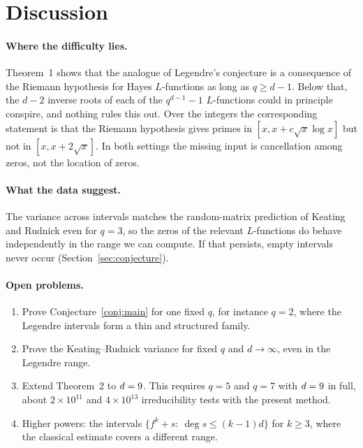 \documentclass[11pt,a4paper]{article}
\theoremstyle{definition}
\theoremstyle{remark}
\begin{document}
\section{Discussion}\label{sec:discussion}

\paragraph{Where the difficulty lies.}
Theorem~1 shows that the analogue of Legendre's conjecture is a consequence of the Riemann
hypothesis for Hayes $L$-functions as long as $q\ge d-1$. Below that, the $d-2$ inverse roots of
each of the $q^{d-1}-1$ $L$-functions could in principle conspire, and nothing rules this out.
Over the integers the corresponding statement is that the Riemann hypothesis gives primes in
$[x,x+c\sqrt x\log x]$ but not in $[x,x+2\sqrt x]$. In both settings the missing input is
cancellation among zeros, not the location of zeros.

\paragraph{What the data suggest.}
The variance across intervals matches the random-matrix prediction of Keating and Rudnick even for
$q=3$, so the zeros of the relevant $L$-functions do behave independently in the range we can
compute. If that persists, empty intervals never occur (Section~\ref{sec:conjecture}).

\paragraph{Open problems.}
\begin{enumerate}[label=(\arabic*),nosep]
\item Prove Conjecture~\ref{conj:main} for one fixed $q$, for instance $q=2$, where the Legendre
      intervals form a thin and structured family.
\item Prove the Keating--Rudnick variance for fixed $q$ and $d\to\infty$, even in the Legendre range.
\item Extend Theorem~2 to $d=9$. This requires $q=5$ and $q=7$ with $d=9$ in full,
      about $2\times10^{11}$ and $4\times10^{13}$ irreducibility tests with the present method.
\item Higher powers: the intervals $\{f^k+s:\ \deg s\le(k-1)d\}$ for $k\ge3$, where the
      classical estimate covers a different range.
\end{enumerate}
\end{document}
